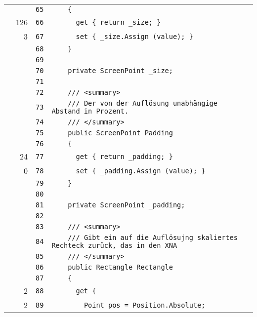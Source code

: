 \documentclass[a4paper,10pt]{article}
\begin{document}
\begin{longtable}[l]{lrrl}
\cellcolor{gray} &  & \verb~65~ & \verb~    {~\\
\cellcolor{green} & 126 & \verb~66~ & \verb~      get { return _size; }~\\
\cellcolor{green} & 3 & \verb~67~ & \verb~      set { _size.Assign (value); }~\\
\cellcolor{gray} &  & \verb~68~ & \verb~    }~\\
\cellcolor{gray} &  & \verb~69~ & \verb~~\\
\cellcolor{gray} &  & \verb~70~ & \verb~    private ScreenPoint _size;~\\
\cellcolor{gray} &  & \verb~71~ & \verb~~\\
\cellcolor{gray} &  & \verb~72~ & \verb~    /// <summary>~\\
\cellcolor{gray} &  & \verb~73~ & \verb~    /// Der von der Auflösung unabhängige Abstand in Prozent.~\\
\cellcolor{gray} &  & \verb~74~ & \verb~    /// </summary>~\\
\cellcolor{gray} &  & \verb~75~ & \verb~    public ScreenPoint Padding~\\
\cellcolor{gray} &  & \verb~76~ & \verb~    {~\\
\cellcolor{green} & 24 & \verb~77~ & \verb~      get { return _padding; }~\\
\cellcolor{red} & 0 & \verb~78~ & \verb~      set { _padding.Assign (value); }~\\
\cellcolor{gray} &  & \verb~79~ & \verb~    }~\\
\cellcolor{gray} &  & \verb~80~ & \verb~~\\
\cellcolor{gray} &  & \verb~81~ & \verb~    private ScreenPoint _padding;~\\
\cellcolor{gray} &  & \verb~82~ & \verb~~\\
\cellcolor{gray} &  & \verb~83~ & \verb~    /// <summary>~\\
\cellcolor{gray} &  & \verb~84~ & \verb~    /// Gibt ein auf die Auflösujng skaliertes Rechteck zurück, das in den XNA~\\
\cellcolor{gray} &  & \verb~85~ & \verb~    /// </summary>~\\
\cellcolor{gray} &  & \verb~86~ & \verb~    public Rectangle Rectangle~\\
\cellcolor{gray} &  & \verb~87~ & \verb~    {~\\
\cellcolor{green} & 2 & \verb~88~ & \verb~      get {~\\
\cellcolor{green} & 2 & \verb~89~ & \verb~        Point pos = Position.Absolute;~\\

\end{longtable}
\end{document}
